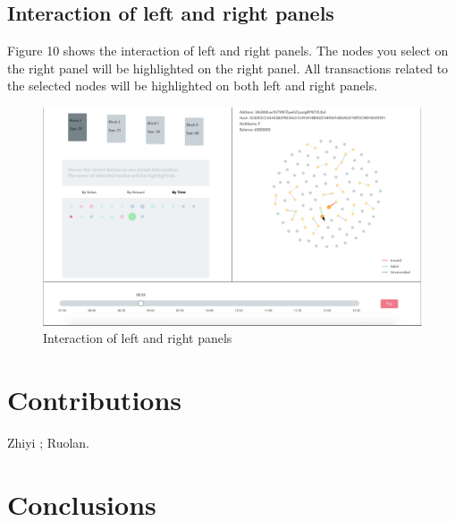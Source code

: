 \documentclass[journal, a4paper]{IEEEtran}
\begin{document}
\subsection{Interaction of left and right panels}
Figure 10 shows the interaction of left and right panels. The nodes you select on the right panel will be highlighted on the right panel. All transactions related to the selected nodes will be highlighted on both left and right panels.
\begin{figure}[!hbt]
		\begin{center}
		\includegraphics[width=\columnwidth]{clicknodes.png}
		\caption{Interaction of left and right panels}
		\label{fig:clicknodes}
		\end{center}
	\end{figure}

\section{Contributions}
Zhiyi ; Ruolan.
\section{Conclusions}
\end{document}
